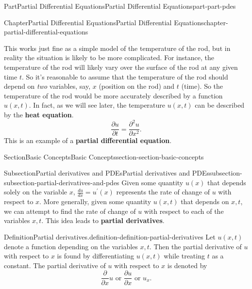 \documentclass[twoside,10pt,]{book}
\newcommand{\terminology}[1]{\textbf{#1}}
\numberwithin{equation}{part}
\begin{document}
\begin{partptx}{Part}{Partial Differential Equations}{}{Partial Differential Equations}{}{}{part-part-pdes}
\begin{chapterptx}{Chapter}{Partial Differential Equations}{}{Partial Differential Equations}{}{}{chapter-partial-differential-equations}
\begin{introduction}{}
\par
This works just fine as a simple model of the temperature of the rod, but in reality the situation is likely to be more complicated. For instance, the temperature of the rod will likely vary over the surface of the rod at any given time \(t\). So it's reasonable to assume that the temperature of the rod should depend on \emph{two} variables, say, \(x\) (position on the rod) and \(t\) (time). So the temperature of the rod would be more accurately described by a function \(u(x,t)\). In fact, as we will see later, the temperature \(u(x,t)\) can be described by the \terminology{heat equation}.%
%
\begin{equation*}
\frac{\partial u}{\partial t} = \frac{\partial^{2}u}{\partial x^{2}}\text{.}
\end{equation*}
This is an example of a \terminology{partial differential equation}.%
\end{introduction}%
%
%
\typeout{************************************************}
\typeout{************************************************}
%
\begin{sectionptx}{Section}{Basic Concepts}{}{Basic Concepts}{}{}{section-section-basic-concepts}
%
%
\typeout{************************************************}
\typeout{************************************************}
%
\begin{subsectionptx}{Subsection}{Partial derivatives and PDEs}{}{Partial derivatives and PDEs}{}{}{subsection-subsection-partial-derivatives-and-pdes}
Given some quantity \(u(x)\) that depends solely on the variable \(x\), \(\frac{du}{dx} = u^{\prime}(x)\) represents the rate of change of \(u\) with respect to \(x\). More generally, given some quantity \(u(x,t)\) that depends on \(x,t\), we can attempt to find the rate of change of \(u\) with respect to each of the variables \(x,t\). This idea leads to \terminology{partial derivatives}.%
\begin{definition}{Definition}{Partial derivatives.}{definition-definition-partial-derivatives}%
%
Let \(u(x,t)\) denote a function depending on the variables \(x,t\). Then the partial derivative of \(u\) with respect to \(x\) is found by differentiating \(u(x,t)\) while treating \(t\) as a constant. The partial derivative of \(u\) with respect to \(x\) is denoted by%
\begin{equation*}
\frac{\partial}{\partial x}u\text{ or }\frac{\partial u}{\partial x}\text{ or }u_{x}.

\end{equation*}
\end{definition}
\end{subsectionptx}
\end{sectionptx}
\end{chapterptx}
\end{partptx}
\end{document}
